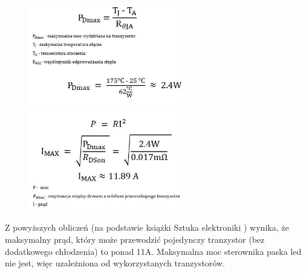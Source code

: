 \documentclass[12pt, eng, twoside, openany, final]{mgr}
\begin{document}
                \begin{figure}[H]
                \begin{center}
                    \includegraphics[width=0.6\textwidth]{obliczenia1.jpg}
                    \includegraphics[width=0.6\textwidth]{obliczenia2.jpg}
                \end{center}
                \end{figure}
                \noindent Z powyższych obliczeń (na podstawie książki Sztuka elektroniki\cite{sztuka} ) wynika, że maksymalny prąd, który może przewodzić pojedynczy tranzystor (bez dodatkowego chłodzenia) to ponad 11A. Maksymalna moc sterownika paska led nie jest, więc uzależniona od wykorzystanych tranzystorów.  
                
            
\end{document}
